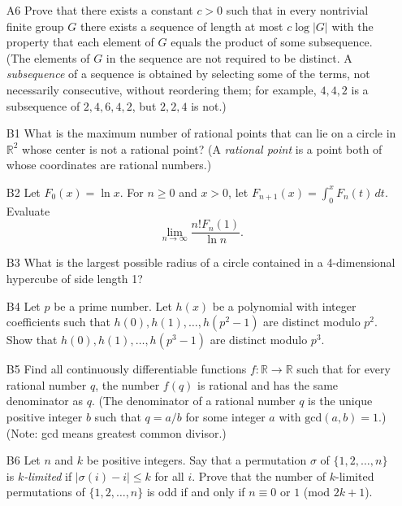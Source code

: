 \documentclass[amssymb,twocolumn,pra,10pt,aps]{revtex4-1}
\begin{document}
\begin{itemize}
\item[A6]
Prove that there exists a constant $c>0$ such that in every
nontrivial finite group $G$ there exists a sequence of length
at most $c \log |G|$ with the property that each element of $G$
equals the product of some subsequence. (The elements of $G$ in the
sequence are not required to be distinct. A \emph{subsequence}
of a sequence is obtained by selecting some of the terms,
not necessarily consecutive, without reordering them; for
example, $4, 4, 2$ is a subsequence of $2, 4, 6, 4, 2$, but
$2, 2, 4$ is not.)

\item[B1]
What is the maximum number of rational points that can lie on a circle
in $\mathbb{R}^2$ whose center is not a rational point? (A \emph{rational
point} is a point both of whose coordinates are rational numbers.)

\item[B2]
Let $F_0(x) = \ln x$. For $n \geq 0$ and $x > 0$, let
$F_{n+1}(x) = \int_0^x F_n(t)\,dt$. Evaluate
\[
\lim_{n \to \infty} \frac{n! F_n(1)}{\ln n}.
\]

\item[B3]
What is the largest possible radius of a circle contained in a 4-dimensional
hypercube of side length 1?

\item[B4]
Let $p$ be a prime number. Let $h(x)$ be a polynomial with integer coefficients
such that $h(0), h(1), \dots, h(p^2-1)$ are distinct modulo $p^2$.
Show that $h(0), h(1), \dots, h(p^3-1)$ are distinct modulo $p^3$.

\item[B5]
Find all continuously differentiable functions $f: \mathbb{R} \to \mathbb{R}$
such that for every rational number $q$, the number $f(q)$ is rational
and has the same denominator as $q$. (The denominator of a rational number
$q$ is the unique positive integer $b$ such that $q = a/b$
for some integer $a$ with $\mathrm{gcd}(a,b) = 1$.)
(Note: gcd means greatest common
divisor.)

\item[B6]
Let $n$ and $k$ be positive integers. Say that a permutation $\sigma$
of $\{1,2,\dots,n\}$ is \emph{$k$-limited} if $|\sigma(i) - i| \leq k$
for all $i$. Prove that the number of $k$-limited permutations of
$\{1,2,\dots,n\}$ is odd if and only if $n \equiv 0$ or $1$
(mod $2k+1$).

\end{itemize}
\end{document}
